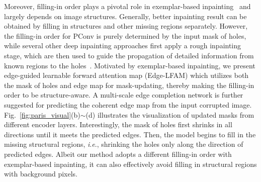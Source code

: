 \documentclass[10pt,journal,compsoc]{IEEEtran}
\newcommand{\ie}{\textit{i}.\textit{e}.}
\begin{document}
Moreover, filling-in order plays a pivotal role in exemplar-based inpainting~\cite{criminisi2004region,Barnes:2009:PAR,XuPatchSparsity} and largely depends on image structures.
%
Generally, better inpainting result can be obtained by filling in structures and other missing regions separately.
%
However, the filling-in order for PConv is purely determined by the input mask of holes,
%
while several other deep inpainting approaches first apply a rough inpainting stage, which are then used to guide the propagation of detailed information from known regions to
the holes~\cite{Yang_2017_CVPR,song_contextual_2018,Yan_2018_Shift,yu2018generative}.
%
Motivated by exemplar-based inpainting, we present edge-guided learnable forward attention map (Edge-LFAM) which utilizes both the mask of holes and edge map for mask-updating, thereby making the filling-in order to be structure-aware.
%
A multi-scale edge completion network is further suggested for predicting the coherent edge map from the input corrupted image.
%
Fig.~\ref{fig:paris_visual}{(b)$\sim$(d)} illustrates the visualization of updated masks from different encoder layers.
%
Interestingly, the mask of holes first shrinks in all directions until it meets the predicted edges.
%
Then, the model begins to fill in the missing structural regions, \ie, shrinking the holes only along the direction of predicted edges.
%
Albeit our method adopts a different filling-in order with exemplar-based inpainting, it can also effectively avoid filling in structural regions with background pixels.


%
%
%
%




%
\end{document}
